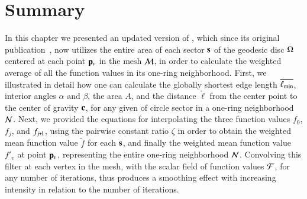 \section{Summary}
\label{ch4sS}
In this chapter we presented an updated version of , which since its original publication~\cite[s.~3.2]{Mara17}, now utilizes the entire area of each sector $\mathbf{s}$ of the geodesic disc $\Omega$ centered at each point $\mathbf{p}_v$ in the mesh $\mathcal{M}$, in order to calculate the weighted average of all the function values in its one-ring neighborhood. First, we illustrated in detail how one can calculate the globally shortest edge length $\overline{\ell_\text{min}}$, interior angles $\alpha$ and $\beta$, the area $A$, and the distance $\check{\ell}$ from the center point to the center of gravity $\mathbf{c}$, for any given of circle sector in a one-ring neighborhood $\mathcal{N}$. Next, we provided the equations for interpolating the three function values $f_0$, $f_j$, and $f_{\sjpo}$, using the pairwise constant ratio $\zeta$ in order to obtain the weighted mean function value $\tilde{f}$ for each $\mathbf{s}$, and finally the weighted mean function value $f'_v$ at point $\mathbf{p}_v$, representing the entire one-ring neighborhood $\mathcal{N}$. Convolving this filter at each vertex in the mesh, with the scalar field of function values $\mathcal{F}$, for any number of iterations, thus produces a smoothing effect with increasing intensity in relation to the number of iterations.
